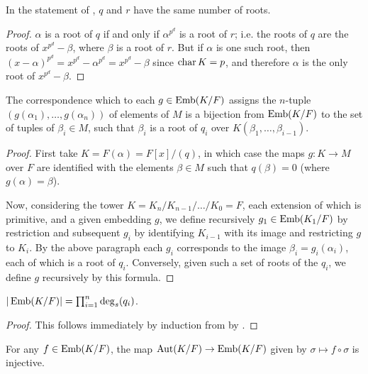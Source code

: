 \begin{corollary} In the statement of , $q$ and $r$ have the same
number of roots.
\label{sep_roots}
\end{corollary}

\begin{proof} $\alpha$ is a root of $q$ if and only if $\alpha^{p^d}$ is a
root of $r$; i.e. the roots of $q$ are the roots of $x^{p^d} - \beta$, where
$\beta$ is a root of $r$.  But if $\alpha$ is one such root, then $(x -
\alpha)^{p^d} = x^{p^d} - \alpha^{p^d} = x^{p^d} - \beta$ since $\operatorname{\text{char}}{K} =
p$, and therefore $\alpha$ is the only root of $x^{p^d} - \beta$. \end{proof}

\begin{lemma} The correspondence which to each $g \in \operatorname{\text{Emb}}(K/F)$ assigns the
$n$-tuple $(g(\alpha_1), \dots, g(\alpha_n))$ of elements of $M$ is a
bijection from $\operatorname{\text{Emb}}(K/F)$ to the set of tuples of $\beta_i \in M$, such that
$\beta_i$ is a root of $q_i$ over $K(\beta_1, \dots, \beta_{i - 1})$.
\label{emb_roots}
\end{lemma}

\begin{proof} First take $K = F(\alpha) = F[x]/(q)$, in which case the maps $g
\colon K \to M$ over $F$ are identified with the elements $\beta \in M$ such
that $q(\beta) = 0$ (where $g(\alpha) = \beta$).

Now, considering the tower $K = K_n / K_{n - 1} / \dots / K_0 = F$, each
extension of which is primitive, and a given embedding $g$, we define
recursively $g_1 \in \operatorname{\text{Emb}}(K_1/F)$ by restriction and subsequent $g_i$ by
identifying $K_{i - 1}$ with its image and restricting $g$ to $K_i$.  By the
above paragraph each $g_i$ corresponds to the image $\beta_i = g_i(\alpha_i)$,
each of which is a root of $q_i$.  Conversely, given such a set of roots of
the $q_i$, we define $g$ recursively by this formula. \end{proof}

\begin{corollary} $|\operatorname{\text{Emb}}(K/F)| = \prod_{i = 1}^n \deg_s(q_i)$.
\label{emb_size}
\end{corollary}

\begin{proof} This follows immediately by induction from  by
. \end{proof}

\begin{lemma} For any $f \in \operatorname{\text{Emb}}(K/F)$, the map $\operatorname{\text{Aut}}(K/F) \to \operatorname{\text{Emb}}(K/F)$ given
by $\sigma \mapsto f \circ \sigma$ is injective.  
\label{aut_inj}
\end{lemma}

